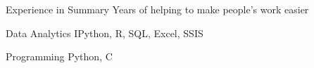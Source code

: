 

\begin{cvskills}
  \cvskill
    {Experience in Summary} %
    {Years of helping to make people's work easier} %

  \cvskill
    {Data Analytics} %
    {IPython, R, SQL, Excel, SSIS} %

  \cvskill
    {Programming} %
    {Python, C} %

\end{cvskills}
